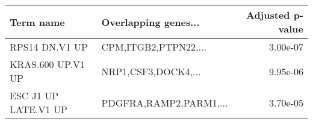 \begin{tabular}{llr}
\toprule
           Term name &   Overlapping genes... &  Adjusted p-value \\
\midrule
      RPS14 DN.V1 UP &   CPM,ITGB2,PTPN22,... &          3.00e-07 \\
   KRAS.600 UP.V1 UP &    NRP1,CSF3,DOCK4,... &          9.95e-06 \\
ESC J1 UP LATE.V1 UP & PDGFRA,RAMP2,PARM1,... &          3.70e-05 \\
\bottomrule
\end{tabular}
